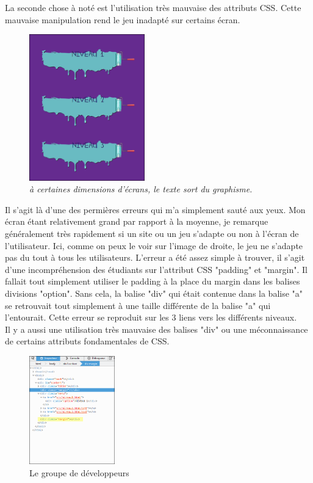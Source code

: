 \documentclass{article}
\begin{document}
La seconde chose à noté est l'utilisation très mauvaise des attributs CSS. Cette mauvaise manipulation rend le jeu inadapté sur certains écran.\\
\begin{figure}
\vspace{-13pt}
\centering
\includegraphics[width=5cm]{1}
\caption{\textit{à certaines dimensions d'écrans, le texte sort du graphisme.}}
\end{figure}
Il s'agit là d'une des permières erreurs qui m'a simplement sauté aux yeux. Mon écran étant relativement grand par rapport à la moyenne, je remarque généralement très rapidement si un site ou un jeu s'adapte ou non à l'écran de l'utilisateur. Ici, comme on peux le voir sur l'image de droite, le jeu ne s'adapte pas du tout à tous les utilisateurs. L'erreur a été assez simple à trouver, il s'agit d'une incompréhension des étudiants sur l'attribut CSS "padding" et "margin". Il fallait tout simplement utiliser le padding à la place du margin dans les balises divisions "option". Sans cela, la balise "div" qui était contenue dans la balise "a" se retrouvait tout simplement à une taille différente de la balise "a" qui l'entourait. Cette erreur se reproduit sur les 3 liens vers les différents niveaux.\\

Il y a aussi une utilisation très mauvaise des balises "div" ou une méconnaissance de certains attributs fondamentales de CSS.\\


\begin{figure}
  \vspace{-20pt}
  \begin{center}
    \includegraphics[width=0.33\textwidth]{3}
  \end{center}
  \vspace{-20pt}
  \caption{Le groupe de développeurs}
  \vspace{-10pt}
\end{figure}
\end{document}
